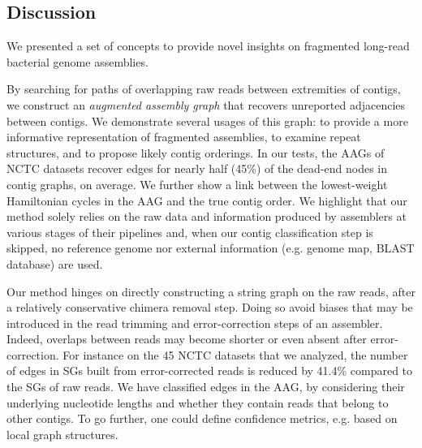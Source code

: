 \documentclass[./main.tex]{subfiles}
\newcommand{\modafterreview}[1]{#1}
\begin{document}
\subsection{Discussion}

We presented a set of concepts to provide novel insights on fragmented long-read bacterial genome assemblies. 

By searching for paths of overlapping raw reads between extremities of contigs, we construct an \textit{augmented assembly graph} that recovers unreported adjacencies between contigs. We demonstrate several usages of this graph: to provide a more informative representation of fragmented assemblies, to examine repeat structures, and to propose likely contig orderings. In our tests, the AAGs of NCTC datasets \modafterreview{recover edges for nearly half (45\%) of the dead-end nodes in \canu contig graphs, on average}. We further show a link between \modafterreview{the lowest}-weight Hamiltonian cycles in the AAG and the \modafterreview{true} contig order. We highlight that our method solely relies on the raw data and information produced by assemblers at various stages of their pipelines and, \modafterreview{when our contig classification step is skipped,} no reference genome nor external information (e.g. genome map, \modafterreview{BLAST database}) \modafterreview{are} used. 


Our method hinges on \modafterreview{directly} constructing a string graph on the raw reads, \modafterreview{after a relatively conservative chimera removal step}. Doing so avoid biases that may be introduced in the read trimming and error-correction steps \modafterreview{ of an assembler. Indeed, overlaps between reads may become shorter or even absent after error-correction}. For instance on the 45 NCTC datasets that we analyzed, the number of edges in SGs built from \canu error-corrected reads is reduced by 41.4\% compared to the SGs of raw reads.
%
%
%
%
We have classified edges in the AAG, by considering their \modafterreview{underlying nucleotide} lengths and whether \modafterreview{they contain} reads \modafterreview{that} belong to other contigs. %
To go further, one could define confidence metrics, e.g. based on local graph structures.
\end{document}
